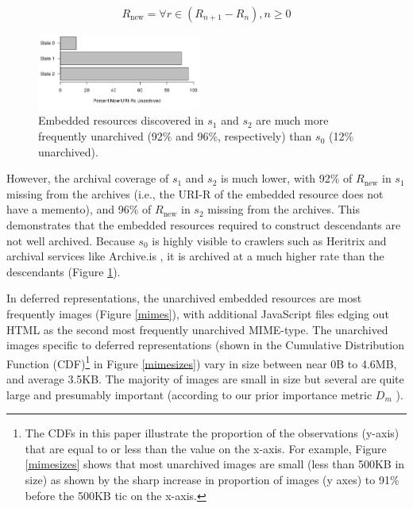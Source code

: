 \documentclass{sig-alternate}
\begin{document}
\begin{equation}
 R_{\text{new}} = \forall r \in (R_{n+1} - R_n), n \geq 0
\label{newER}
\end{equation}


\begin{figure}
\centering
\includegraphics[width=0.48\textwidth]{./imgs/archivedByDepthPctHorz.png}
\caption{Embedded resources discovered in $s_1$ and $s_2$ are much more frequently unarchived (92\% and 96\%, respectively) than $s_0$ (12\% unarchived).}
\label{depth}
\end{figure}


However, the archival coverage of $s_1$ and $s_2$ is much lower, with 92\% of $R_{\text{new}}$ in $s_1$ missing from the archives (i.e., the URI-R of the embedded resource does not have a memento), and 96\% of $R_{\text{new}}$ in $s_2$ missing from the archives. This demonstrates that the embedded resources required to construct descendants are not well archived. Because $s_0$ is highly visible to crawlers such as Heritrix and archival services like Archive.is \cite{archivetoday}, it is archived at a much higher rate than the descendants (Figure \ref{depth}).



In deferred representations, the unarchived embedded resources are most frequently images (Figure \ref{mimes}), with additional JavaScript files edging out HTML as the second most frequently unarchived MIME-type. The unarchived images specific to deferred representations (shown in the Cumulative Distribution Function (CDF)\footnote{The CDFs in this paper illustrate the proportion of the observations (y-axis) that are equal to or less than the value on the x-axis. For example, Figure \ref{mimesizes} shows that most unarchived images are small (less than 500KB in size) as shown by the sharp increase in proportion of images (y axes) to 91\% before the 500KB tic on the x-axis.} in Figure \ref{mimesizes}) vary in size between near 0B to 4.6MB, and average 3.5KB. The majority of images are small in size but several are quite large and presumably important (according to our prior importance metric $D_m$ \cite{damageIJDL}).
\end{document}
